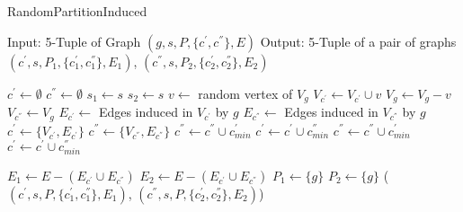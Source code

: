 \begin{algorithm}
\caption{RandomPartitionInduced}
\label{alg:alg09}
\begin{algorithmic}
\STATE Input: 5-Tuple of Graph $(g,s,P,\{c^{'},c^{''}\},E)$
\STATE Output: 5-Tuple of a pair of graphs $(c^{'},s,P_1 ,\{c^{'}_1 ,c^{''}_1 \},E_1 )$, $(c^{''},s,P_2 ,\{c^{'}_2 ,c^{''}_2 \},E_2 )$
\end{algorithmic}
\begin{algorithmic}[1]
\STATE  $c^{'} \leftarrow  \emptyset$
\STATE  $c^{''} \leftarrow \emptyset$
\STATE  $s_1 \leftarrow s$
\STATE  $s_2 \leftarrow s$
 \DO
       \STATE $v \leftarrow$ random vertex of $ V_g $
       \STATE $V_{c^{'}} \leftarrow V_{c^{'}} \cup v $ 
       \STATE  $ V_g \leftarrow V_g - v $
\ENDWHILE
\STATE $ V_{c^{''}} \leftarrow V_g $
\STATE  $E_{c^{'}} \leftarrow $ Edges induced in $V_{c^{'}}$ by $g $
\STATE  $E_{c^{''}} \leftarrow $ Edges induced in $V_{c^{''}}$ by $g$
\STATE  $c^{'} \leftarrow \{V_{c^{'}} , E_{c^{'}}  \}$ 
\STATE  $c^{''} \leftarrow \{V_{c^{''}} , E_{c^{''}}  \}$ 
\REPEAT
                  \STATE $  c^{''} \leftarrow c^{''} \cup  c^{'}_{min} $
             \ELSE
                \STATE $  c^{'} \leftarrow c^{'} \cup c^{''}_{min} $
             \ENDIF
        \ELSE
                   \STATE $  c^{''} \leftarrow c^{''} \cup c^{'}_{min} $
                \ELSE
                   \STATE $  c^{'} \leftarrow c^{'} \cup c^{''}_{min}$ 
                \ENDIF
        \ENDIF

\STATE $E_1 \leftarrow  E -  ( E_{c^{'}} \cup E_{c^{''}} )$
\STATE $E_2 \leftarrow  E -  ( E_{c^{'}} \cup E_{c^{''}} )$
\STATE $P_1 \leftarrow \{g\}$
\STATE $P_2 \leftarrow \{g\}$
\RETURN  ($(c^{'},s,P,\{c^{'}_1 ,c^{''}_1 \},E_1 )$, $(c^{''},s,P,\{c^{'}_2 ,c^{''}_2 \},E_2 )$)
\end{algorithmic}
\end{algorithm}

